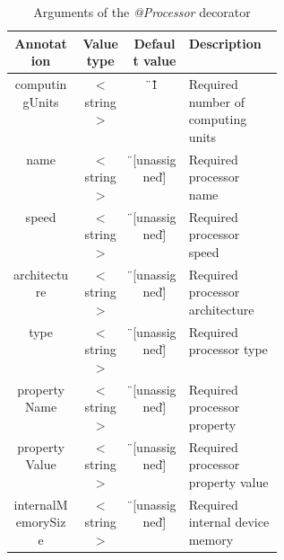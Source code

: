 \bgroup
  \def\arraystretch{1.4}%
  \begin{table}[!ht]
  \centering
  \begin{tabular}{ | c | c | c | p{0.35\linewidth} | }
  \hline
  \textbf{Annotation} 	& \textbf{Value type}	& \textbf{Default value}& \textbf{Description} \\ \hline
  computingUnits 	& $<$string$>$ 		& \"{}1\" 		& Required number of computing units \\ \hline
  name 			& $<$string$>$ 		& \"{}[unassigned]\" 	& Required processor name \\ \hline
  speed 		& $<$string$>$ 		& \"{}[unassigned]\" 	& Required processor speed \\ \hline
  architecture 		& $<$string$>$ 		& \"{}[unassigned]\" 	& Required processor architecture \\ \hline
  type			& $<$string$>$ 		& \"{}[unassigned]\" 	& Required processor type \\ \hline
  propertyName		& $<$string$>$ 		& \"{}[unassigned]\" 	& Required processor property \\ \hline
  propertyValue		& $<$string$>$ 		& \"{}[unassigned]\" 	& Required processor property value \\ \hline
  internalMemorySize 	& $<$string$>$ 		& \"{}[unassigned]\" 	& Required internal device memory \\ \hline
  \end{tabular}
  \caption{Arguments of the \textit{@Processor} decorator}
  \label{tab:processor_constraint}
  \end{table}
\egroup
